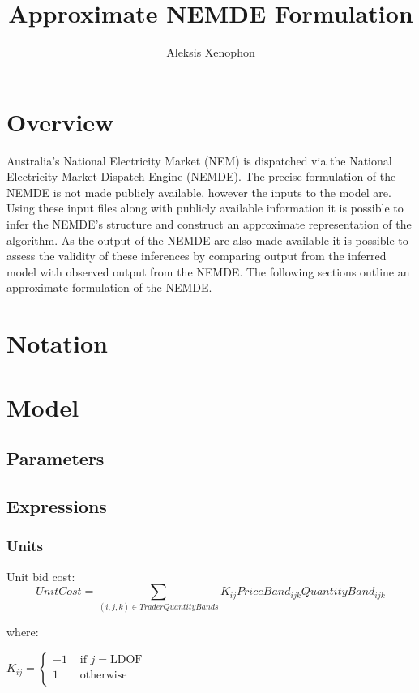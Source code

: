 \documentclass{article}
\title{Approximate NEMDE Formulation}
\author{Aleksis Xenophon}
\begin{document}
\maketitle

\section{Overview}
Australia's National Electricity Market (NEM) is dispatched via the National Electricity Market Dispatch Engine (NEMDE). The precise formulation of the NEMDE is not made publicly available, however the inputs to the model are. Using these input files along with publicly available information it is possible to infer the NEMDE's structure and construct an approximate representation of the algorithm. As the output of the NEMDE are also made available it is possible to assess the validity of these inferences by comparing output from the inferred model with observed output from the NEMDE. The following sections outline an approximate formulation of the NEMDE.

\section{Notation}

\section{Model}

\subsection{Parameters}

\subsection{Expressions}
\subsubsection{Units}
Unit bid cost:
\begin{equation}
	UnitCost = \sum\limits_{(i,j,k) \in TraderQuantityBands} K_{ij} PriceBand_{ijk} QuantityBand_{ijk}
\end{equation}

where:

$K_{ij}=
\begin{cases}
	-1 &\textrm{ if $j=$LDOF} \\
	1 &\textrm{ otherwise} \\
\end{cases}$
\end{document}
